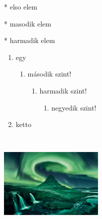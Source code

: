 \documentclass {article}
\begin{document}
\listoffigures




\begin{itemize*}[afterlabel=~,%
itemjoin=\hspace{1em},%
itemjoin*={\hspace{1em}és }]
\item[*] elso elem
\item[*] masodik elem
\item[*] harmadik elem

\end{itemize*}

\begin{enumerate}
\item egy
\begin{enumerate}
\item második szint!
\begin{enumerate}
\item harmadik szint!
\begin{enumerate}
\item negyedik szint!
\end{enumerate}
\end{enumerate}
\end{enumerate}
\item ketto
\end{enumerate}

\lipsum[1]


\begin{description}[align=parleft,%
leftmargin=*,widest={hosszabb}, font=\slshape, style=nextline]
\item \hulipsum[2]
\item[címke] \hulipsum[1]
\item[ez egy hosszabb címke!] \hulipsum[3]
\end{description}

\includegraphics[width=5cm, height=5cm]{../forras/110.jpg}
\end{document}
